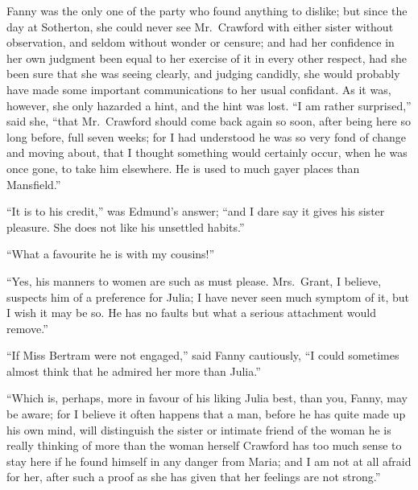 \documentclass{article}
\begin{document}
Fanny was the only one of the party who found anything
to dislike; but since the day at Sotherton, she could never
see Mr.\ Crawford with either sister without observation,
and seldom without wonder or censure; and had her
confidence in her own judgment been equal to her exercise
of it in every other respect, had she been sure that she
was seeing clearly, and judging candidly, she would
probably have made some important communications to her
usual confidant.  As it was, however, she only hazarded
a hint, and the hint was lost.  ``I am rather surprised,''
said she, ``that Mr.\ Crawford should come back again so soon,
after being here so long before, full seven weeks;
for I had understood he was so very fond of change and
moving about, that I thought something would certainly
occur, when he was once gone, to take him elsewhere.
He is used to much gayer places than Mansfield.''

``It is to his credit,'' was Edmund's answer; ``and I dare
say it gives his sister pleasure.  She does not like his
unsettled habits.''

``What a favourite he is with my cousins!''

``Yes, his manners to women are such as must please.
Mrs.\ Grant, I believe, suspects him of a preference for Julia;
I have never seen much symptom of it, but I wish it may
be so.  He has no faults but what a serious attachment
would remove.''

``If Miss Bertram were not engaged,'' said Fanny cautiously,
``I could sometimes almost think that he admired her more
than Julia.''

``Which is, perhaps, more in favour of his liking
Julia best, than you, Fanny, may be aware; for I believe
it often happens that a man, before he has quite made up
his own mind, will distinguish the sister or intimate
friend of the woman he is really thinking of more than
the woman herself Crawford has too much sense to stay
here if he found himself in any danger from Maria;
and I am not at all afraid for her, after such a proof
as she has given that her feelings are not strong.''
\end{document}
